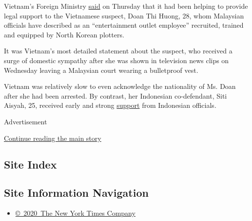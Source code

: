 Vietnam's Foreign Ministry
\href{http://www.mofa.gov.vn/en/tt_baochi/pbnfn/ns170227105211}{said} on
Thursday that it had been helping to provide legal support to the
Vietnamese suspect, Doan Thi Huong, 28, whom Malaysian officials have
described as an ``entertainment outlet employee'' recruited, trained and
equipped by North Korean plotters.

It was Vietnam's most detailed statement about the suspect, who received
a surge of domestic sympathy after she was shown in television news
clips on Wednesday leaving a Malaysian court wearing a bulletproof vest.

Vietnam was relatively slow to even acknowledge the nationality of Ms.
Doan after she had been arrested. By contrast, her Indonesian
co-defendant, Siti Aisyah, 25, received early and strong
\href{http://www.thestar.com.my/news/nation/2017/02/17/siti-aisyah-a-victim-says-indonesia-vice-president/}{support}
from Indonesian officials.

Advertisement

\protect\hyperlink{after-bottom}{Continue reading the main story}

\hypertarget{site-index}{%
\subsection{Site Index}\label{site-index}}

\hypertarget{site-information-navigation}{%
\subsection{Site Information
Navigation}\label{site-information-navigation}}

\begin{itemize}
\tightlist
\item
  \href{https://help.nytimes.com/hc/en-us/articles/115014792127-Copyright-notice}{©~2020~The
  New York Times Company}
\end{itemize}

